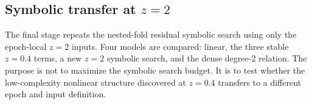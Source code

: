 \subsection{Symbolic transfer at \texorpdfstring{$z=2$}{z=2}}

The final stage repeats the nested-fold residual symbolic search using only the
epoch-local $z=2$ inputs. Four models are compared: linear, the three stable
$z=0.4$ terms, a new $z=2$ symbolic search, and the dense degree-2 relation.
The purpose is not to maximize the symbolic search budget. It is to test whether
the low-complexity nonlinear structure discovered at $z=0.4$ transfers to a
different epoch and input definition.
